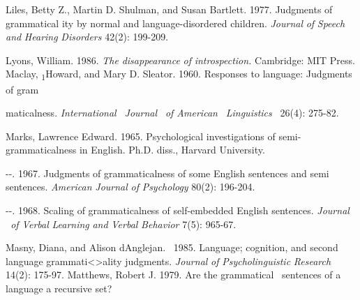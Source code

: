 \begin{styleStandard}
Liles, Betty Z., Martin D. Shulman, and Susan Bartlett. 1977. Judgments of grammatical\- ity by normal and language-disordered children. \textit{Journal}\textit{ }\textit{of}\textit{ }\textit{Speech}\textit{ }\textit{and}\textit{ }\textit{Hearing}\textit{ }\textit{Disorders}\textit{ }42(2): 199-209.
\end{styleStandard}


\begin{styleStandard}
Lyons, William. 1986. \textit{The}\textit{ }\textit{disappearance}\textit{ }\textit{of}\textit{ }\textit{introspection. }Cambridge: MIT Press. Maclay, \textsubscript{1}Howard, and Mary D. Sleator. 1960. Responses to language: Judgments of gram\-
\end{styleStandard}


\begin{styleStandard}
maticalness. \textit{International }\textit{\ }\textit{Journal }\textit{\ }\textit{of American }\textit{\ }\textit{Linguistics }\textit{\ }26(4): 275-82.
\end{styleStandard}


\begin{styleStandard}
Marks, Lawrence Edward. 1965. Psychological investigations of semi-grammaticalness in English. Ph.D. diss., Harvard University.
\end{styleStandard}


\begin{listWWNumvleveli}
\item 
\begin{styleStandard}
{}-{}-. 1967. Judgments of grammaticalness of some English sentences and semi\- sentences. \textit{American}\textit{ }\textit{Journal}\textit{ }\textit{of}\textit{ }\textit{Psychology}\textit{ }80(2): 196-204.
\end{styleStandard}


\item 
\begin{styleStandard}
{}-{}-. 1968. Scaling of grammaticalness of self-embedded English sentences. \textit{Journal}\textit{ \ }\textit{of Verbal}\textit{ }\textit{Learning}\textit{ }\textit{and}\textit{ }\textit{Verbal}\textit{ }\textit{Behavior}\textit{ }7(5): 965-67.
\end{styleStandard}


\end{listWWNumvleveli}
\begin{styleStandard}
Masny, Diana, and Alison d{\textquotesingle}Anglejan. \ 1985. Language; cognition, and second language grammati{\textless}{\textgreater}ality judgments. \textit{Journal}\textit{ }\textit{of}\textit{ }\textit{Psycholinguistic}\textit{ }\textit{Research}\textit{ }14(2): 175{\textquotesingle}-97. Matthews, Robert J. 1979. Are the grammatical \ sentences of a language a recursive set?
\end{styleStandard}


